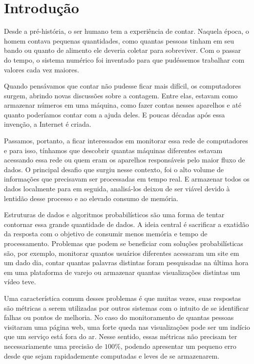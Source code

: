 \chapter{Introdução}
\label{chap:introducao}

Desde a pré-história, o ser humano tem a experiência de contar. Naquela época, o homem contava pequenas quantidades, 
como quantas pessoas tinham em seu bando ou quanto de alimento ele deveria coletar para sobreviver. Com o passar do 
tempo, o sistema numérico foi inventado para que pudéssemos trabalhar com valores cada vez maiores. 

Quando pensávamos que contar não pudesse ficar mais difícil, os computadores surgem, abrindo novas discussões sobre a 
contagem. Entre elas, estavam como armazenar números em uma máquina, como fazer contas nesses aparelhos e até quanto 
poderíamos contar com a ajuda deles. E poucas décadas após essa invenção, a Internet é criada. 

Passamos, portanto, a ficar interessados em monitorar essa rede de computadores e para isso, tínhamos que descobrir 
quantas máquinas diferentes estavam acessando essa rede ou quem eram os aparelhos responsáveis pelo maior fluxo de dados. 
O principal desafio que surgiu nesse contexto, foi o alto volume de informações que precisavam ser processadas em tempo 
real. E armazenar todos os dados localmente para em seguida, analisá-los deixou de ser viável devido à lentidão desse 
processo e ao elevado consumo de memória.

Estruturas de dados e algoritmos probabilísticos são uma forma de tentar contornar essa grande quantidade de dados. A 
ideia central é sacrificar a exatidão da resposta com o objetivo de consumir menos memória e tempo de processamento. 
Problemas que podem se beneficiar com soluções probabilísticas são, por exemplo, monitorar quantos usuários diferentes 
acessaram um site em um dado dia, contar quantas palavras distintas foram pesquisadas na última hora em uma plataforma 
de varejo ou armazenar quantas visualizações distintas um vídeo teve. 

Uma característica comum desses problemas é que muitas vezes, suas respostas são métricas a serem utilizadas por outros 
sistemas com o intuito de se identificar falhas ou pontos de melhoria. No caso do monitoramento de quantas pessoas 
visitaram uma página web, uma forte queda nas visualizações pode ser um indício que um serviço está fora do ar. Nesse 
sentido, essas métricas não precisam ter necessariamente uma precisão de $100\%$, podendo apresentar um pequeno erro 
desde que sejam rapidademente computadas e leves de se armazenarem.

